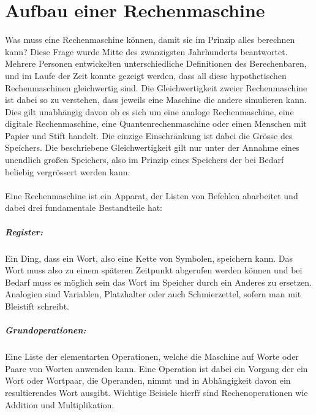 \documentclass[11pt,a4paper,leqno]{report}
\numberwithin{equation}{chapter}
\begin{document}
\chapter{Aufbau einer Rechenmaschine}
Was muss eine Rechenmaschine k\"onnen, damit sie im Prinzip alles berechnen kann?
Diese Frage wurde Mitte des zwanzigsten Jahrhunderts beantwortet. Mehrere Personen entwickelten unterschiedliche Definitionen des Berechenbaren, und im Laufe der Zeit konnte gezeigt werden, dass all diese hypothetischen Rechenmaschinen gleichwertig sind. Die Gleichwertigkeit zweier Rechenmaschine ist dabei so zu verstehen, dass jeweils eine Maschine die andere simulieren kann. Dies gilt unabh\"angig davon ob es sich um eine analoge Rechenmaschine, eine digitale Rechenmaschine, eine Quantenrechenmaschine oder einen Menschen mit Papier und Stift handelt. Die einzige Einschr\"ankung ist dabei die Gr\"osse des Speichers. Die beschriebene Gleichwertigkeit gilt nur unter der Annahme eines unendlich großen Speichers, also im Prinzip eines Speichers der bei Bedarf beliebig vergr\"ossert werden kann.\\
\\
Eine Rechenmaschine ist ein Apparat, der Listen von Befehlen abarbeitet und dabei drei fundamentale Bestandteile hat:
\paragraph{Register:} Ein Ding, dass ein Wort, also eine Kette von Symbolen, speichern kann. Das Wort muss also zu einem sp\"ateren Zeitpunkt abgerufen werden k\"onnen und bei Bedarf muss es m\"oglich sein das Wort im Speicher durch ein Anderes zu ersetzen. Analogien sind Variablen, Platzhalter oder auch Schmierzettel, sofern man mit Bleistift schreibt.
\paragraph{Grundoperationen:} Eine Liste der elementarten Operationen, welche die Maschine auf Worte oder Paare von Worten anwenden kann. Eine Operation ist dabei ein Vorgang der ein Wort oder Wortpaar, die Operanden, nimmt und in Abh\"angigkeit davon ein resultierendes Wort ausgibt. Wichtige Beisiele hierf\"r sind Rechenoperationen wie Addition und Multiplikation.
\end{document}
